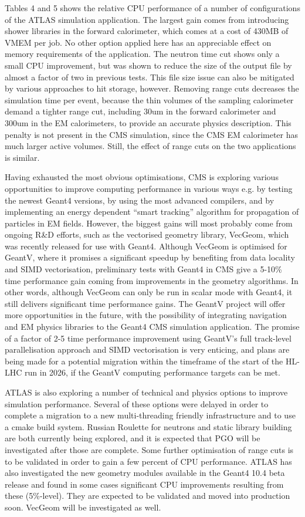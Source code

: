 \documentclass[12pt,a4paper]{article}
\begin{document}
Tables 4 and 5 shows the relative CPU performance of a number of
configurations of the ATLAS simulation application. The largest gain
comes from introducing shower libraries in the forward calorimeter,
which comes at a cost of 430MB of VMEM per job. No other option applied
here has an appreciable effect on memory requirements of the
application. The neutron time cut shows only a small CPU improvement,
but was shown to reduce the size of the output file by almost a factor
of two in previous tests. This file size issue can also be mitigated by
various approaches to hit storage, however. Removing range cuts
decreases the simulation time per event, because the thin volumes of the
sampling calorimeter demand a tighter range cut, including 30um in the
forward calorimeter and 300um in the EM calorimeters, to provide an
accurate physics description. This penalty is not present in the CMS
simulation, since the CMS EM calorimeter has much larger active volumes.
Still, the effect of range cuts on the two applications is similar.

Having exhausted the most obvious optimisations, CMS is exploring
various opportunities to improve computing performance in various ways
e.g. by testing the newest Geant4 versions, by using the most advanced
compilers, and by implementing an energy dependent ``smart tracking''
algorithm for propagation of particles in EM fields. However, the
biggest gains will most probably come from ongoing R\&D efforts, such as
the vectorised geometry library, VecGeom, which was recently released
for use with Geant4. Although VecGeom is optimised for GeantV, where it
promises a significant speedup by benefiting from data locality and SIMD
vectorisation, preliminary tests with Geant4 in CMS give a 5-10\% time
performance gain coming from improvements in the geometry algorithms. In
other words, although VecGeom can only be run in scalar mode with
Geant4, it still delivers significant time performance gains. The GeantV
project will offer more opportunities in the future, with the
possibility of integrating navigation and EM physics libraries to the
Geant4 CMS simulation application. The promise of a factor of 2-5 time
performance improvement using GeantV's full track-level parallelisation
approach and SIMD vectorisation is very enticing, and plans are being
made for a potential migration within the timeframe of the start of the
HL-LHC run in 2026, if the GeantV computing performance targets can be
met.

ATLAS is also exploring a number of technical and physics options to
improve simulation performance. Several of these options were delayed in
order to complete a migration to a new multi-threading friendly
infrastructure and to use a cmake build system. Russian Roulette for
neutrons and static library building are both currently being explored,
and it is expected that PGO will be investigated after those are
complete. Some further optimisation of range cuts is to be validated in
order to gain a few percent of CPU performance. ATLAS has also
investigated the new geometry modules available in the Geant4 10.4 beta
release and found in some cases significant CPU improvements resulting
from these (5\%-level). They are expected to be validated and moved into
production soon. VecGeom will be investigated as well.
\end{document}
